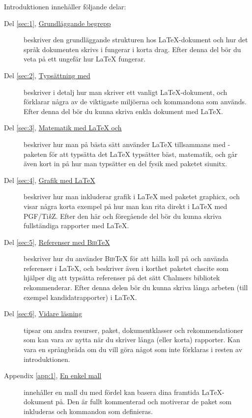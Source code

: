 \documentclass[swe,10pt,nofont]{skrapport}
\makeatletter
\let\@oldLaTeX\LaTeX
\def\LaTeX{\texorpdfstring{\@oldLaTeX}{LaTeX}}
\let\@oldAmS\AmS
\def\AmS{\texorpdfstring{\@oldAmS}{AMS}}
\newcommand\pack[1]{\textsf{#1}}						%
\newcommand\pdfLaTeX{\hologo{pdfLaTeX}\xspace}			%
\newcommand\BibTeX{\textsc{Bib}\TeX\xspace}				%
\newcommand\PGFTikZ{PGF/Ti\emph{k}Z\xspace}				%
\makeatother
\begin{document}
	Introduktionen innehåller följande delar:
	\begin{description}
		\item[{Del \ref{sec:1}, \hyperref[sec:1]{Grundläggande begrepp}}]
		beskriver den grundläggande strukturen hos \LaTeX-dokument och hur det
		språk dokumenten skrivs i fungerar i korta drag. Efter denna del bör
		du veta på ett ungefär hur \LaTeX{} fungerar.
		
		\item[{Del \ref{sec:2}, \hyperref[sec:2]{Typsättning med \pdfLaTeX}}]
		beskriver i detalj hur man skriver ett vanligt
		\LaTeX-dokument, och förklarar några av de viktigaste miljöerna
		och kommandona som används. Efter denna del bör du kunna skriva enkla
		dokument med \LaTeX.
		
		\item[{Del \ref{sec:3}, \hyperref[sec:3]{Matematik med \LaTeX{} och 
		\AmS}}]
		beskriver hur man på bästa sätt använder \LaTeX{} tillsammans med
		\AmS-paketen för att typsätta det \LaTeX{} typsätter bäst, matematik,
		och går även kort in på hur man typsätter en del fysik med paketet
		\pack{siunitx}.
		
		\item[{Del \ref{sec:4}, \hyperref[sec:4]{Grafik med \LaTeX}}]
		beskriver hur man inkluderar grafik i \LaTeX{} med paketet
		\pack{graphicx}, och visar några korta exempel på hur man kan rita
		direkt i \LaTeX{} med \PGFTikZ{}. Efter den här och föregående del bör
		du kunna skriva fullständiga rapporter med \LaTeX.
		
		\item[{Del \ref{sec:5}, \hyperref[sec:5]{Referenser med \BibTeX}}]
		beskriver hur du använder \BibTeX{} för att hålla koll på och använda
		referenser i \LaTeX, och beskriver även i korthet paketet \pack{chscite} som
		hjälper dig att typsätta referenser på det sätt Chalmers bibliotek
		rekommenderar. Efter denna delen bör du kunna skriva långa arbeten
		(till exempel kandidatrapporter) i \LaTeX.
		
		\item[{Del \ref{sec:6}, \hyperref[sec:6]{Vidare läsning}}]
		tipsar om andra resurser, paket, dokumentklasser och rekommendationer
		som kan vara av nytta när du skriver långa (eller korta) rapporter.
		Kan vara en språngbräda om du vill göra något som inte förklaras i
		resten av introduktionen.
		
		\item[Appendix \ref{app:1}, {\hyperref[app:1]{En enkel mall}}]
		innehåller en mall du med fördel kan basera dina framtida 
		\LaTeX{}-dokument
		på. Den är fullt kommenterad och motiverar de paket som inkluderas och
		kommandon som definieras.
	\end{description}
	
\end{document}
